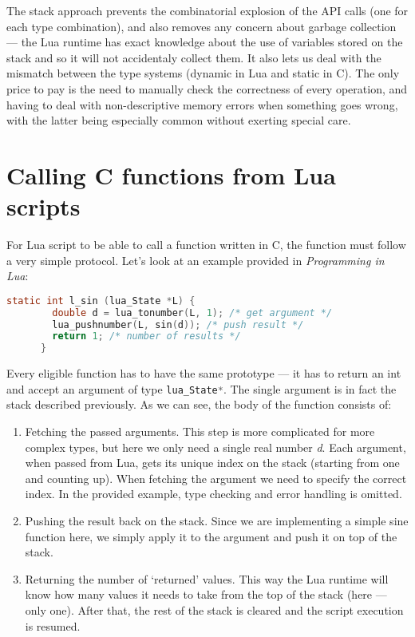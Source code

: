 \documentclass[polish, english]{iithesis}
\begin{document}
    The stack approach prevents the combinatorial explosion of the API calls (one for each type combination), and also removes any concern about garbage collection --- the Lua runtime has exact knowledge about the use of variables stored on the stack and so it will not accidentaly collect them.
    It also lets us deal with the mismatch between the type systems (dynamic in Lua and static in C).
    The only price to pay is the need to manually check the correctness of every operation, and having to deal with non-descriptive memory errors when something goes wrong, with the latter being especially common without exerting special care.
  \section{Calling C functions from Lua scripts}
    For Lua script to be able to call a function written in C, the function must follow a very simple protocol.
    Let's look at an example provided in \textit{Programming in Lua}\cite{pil4}:
    \begin{lstlisting}[caption=Example C function to be called from Lua, language=C]
      static int l_sin (lua_State *L) {
        double d = lua_tonumber(L, 1); /* get argument */
        lua_pushnumber(L, sin(d)); /* push result */
        return 1; /* number of results */
      }
    \end{lstlisting}
    Every eligible function has to have the same prototype --- it has to return an int and accept an argument of type \lstinline[language=C]|lua_State*|.
    The single argument is in fact the stack described previously.
    As we can see, the body of the function consists of:
    \begin{enumerate}
      \item Fetching the passed arguments. 
        This step is more complicated for more complex types, but here we only need a single real number \textit{d}.
        Each argument, when passed from Lua, gets its unique index on the stack (starting from one and counting up).
        When fetching the argument we need to specify the correct index.
        In the provided example, type checking and error handling is omitted.
      \item Pushing the result back on the stack.
        Since we are implementing a simple sine function here, we simply apply it to the argument and push it on top of the stack.
      \item Returning the number of `returned' values.
        This way the Lua runtime will know how many values it needs to take from the top of the stack (here --- only one).
        After that, the rest of the stack is cleared and the script execution is resumed.
    \end{enumerate}
\end{document}

